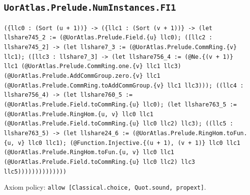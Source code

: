\documentclass[11pt]{article}
\begin{document}
\subsection*{\texttt{UorAtlas.Prelude.NumInstances.FI1}}
\noindent\texttt{(\{llc0 : (Sort (u + 1))\} -> (\{llc1 : (Sort (v + 1))\} -> (let llshare745\_2 := (@UorAtlas.Prelude.Field.\{u\} llc0); ([llc2 : llshare745\_2] -> (let llshare7\_3 := (@UorAtlas.Prelude.CommRing.\{v\} llc1); ([llc3 : llshare7\_3] -> (let llshare756\_4 := (@Ne.\{(v + 1)\} llc1 (@UorAtlas.Prelude.CommRing.one.\{v\} llc1 llc3) (@UorAtlas.Prelude.AddCommGroup.zero.\{v\} llc1 (@UorAtlas.Prelude.CommRing.toAddCommGroup.\{v\} llc1 llc3))); ((llc4 : llshare756\_4) -> (let llshare760\_5 := (@UorAtlas.Prelude.Field.toCommRing.\{u\} llc0); (let llshare763\_5 := (@UorAtlas.Prelude.RingHom.\{u, v\} llc0 llc1 (@UorAtlas.Prelude.Field.toCommRing.\{u\} llc0 llc2) llc3); ((llc5 : llshare763\_5) -> (let llshare24\_6 := (@UorAtlas.Prelude.RingHom.toFun.\{u, v\} llc0 llc1); (@Function.Injective.\{(u + 1), (v + 1)\} llc0 llc1 (@UorAtlas.Prelude.RingHom.toFun.\{u, v\} llc0 llc1 (@UorAtlas.Prelude.Field.toCommRing.\{u\} llc0 llc2) llc3 llc5))))))))))))))}\par
\noindent Axiom policy: \texttt{allow [Classical.choice, Quot.sound, propext]}.\par
\end{document}
